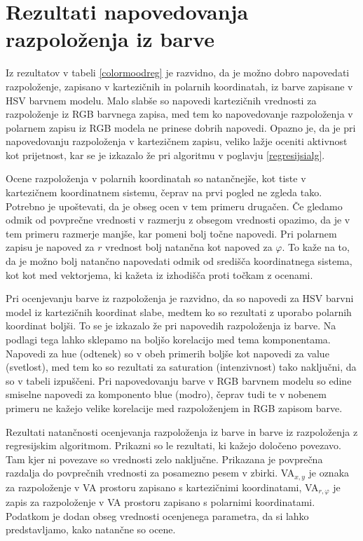 \documentclass[a4paper, 12pt]{book}
\begin{document}
{\section{Rezultati napovedovanja razpoloženja iz barve}

Iz rezultatov v tabeli \ref{colormoodreg} je razvidno, da je možno dobro napovedati razpoloženje, zapisano v kartezičnih in polarnih koordinatah, iz barve zapisane v HSV barvnem modelu. Malo slabše so napovedi kartezičnih vrednosti za razpoloženje iz RGB barvnega zapisa, med tem ko napovedovanje razpoloženja v polarnem zapisu iz RGB modela ne prinese dobrih napovedi. Opazno je, da je pri napovedovanju razpoloženja v kartezičnem zapisu, veliko lažje oceniti aktivnost kot prijetnost, kar se je izkazalo že pri algoritmu v poglavju \ref{regresijsialg}. 

Ocene razpoloženja v polarnih koordinatah so natančnejše, kot tiste v kartezičnem koordinatnem sistemu, čeprav na prvi pogled ne zgleda tako. Potrebno je upoštevati, da je obseg ocen v tem primeru drugačen. Če gledamo odmik od povprečne vrednosti v razmerju z obsegom vrednosti opazimo, da je v tem primeru razmerje manjše, kar pomeni bolj točne napovedi. Pri polarnem zapisu je napoved za $r$ vrednost bolj natančna kot napoved za $\varphi$. To kaže na to, da je možno bolj natančno napovedati odmik od središča koordinatnega sistema, kot kot med vektorjema, ki kažeta iz izhodišča proti točkam z ocenami.

Pri ocenjevanju barve iz razpoloženja je razvidno, da so napovedi za HSV barvni model iz kartezičnih koordinat slabe, medtem ko so rezultati z uporabo polarnih koordinat boljši. To se je izkazalo že pri napovedih razpoloženja iz barve. Na podlagi tega lahko sklepamo na boljšo korelacijo med tema komponentama. Napovedi za hue (odtenek) so v obeh primerih boljše kot napovedi za value (svetlost), med tem ko so rezultati za saturation (intenzivnost) tako naključni, da so v tabeli izpuščeni. Pri napovedovanju barve v RGB barvnem modelu so edine smiselne napovedi za komponento blue (modro), čeprav tudi te v nobenem primeru ne kažejo velike korelacije med razpoloženjem in RGB zapisom barve. 

\begin{table}[hbt]
\begin{center}

\caption{Rezultati natančnosti ocenjevanja razpoloženja iz barve in barve iz razpoloženja z regresijskim algoritmom. Prikazni so le rezultati, ki kažejo določeno povezavo. Tam kjer ni povezave so vrednosti zelo naključne. Prikazana je povprečna razdalja do povprečnih vrednosti za posamezno pesem v zbirki. VA$_{x,y}$ je oznaka za razpoloženje v VA prostoru zapisano s kartezičnimi koordinatami, VA$_{r,\varphi}$ je zapis za razpoloženje v VA prostoru zapisano s polarnimi koordinatami. Podatkom je dodan obseg vrednosti ocenjenega parametra, da si lahko predstavljamo, kako natančne so ocene. }


\end{center}
\end{table}}
\end{document}
